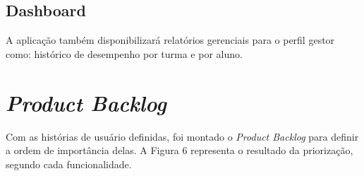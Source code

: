 \subsection{Dashboard}
A aplicação também disponibilizará relatórios gerenciais para o perfil gestor como: histórico de desempenho por turma e por aluno.





\section{\textit{Product Backlog}}
Com as histórias de usuário definidas, foi montado o \textit{Product Backlog} para definir a ordem de importância delas. A Figura 6 representa o resultado da priorização, segundo cada funcionalidade.  

